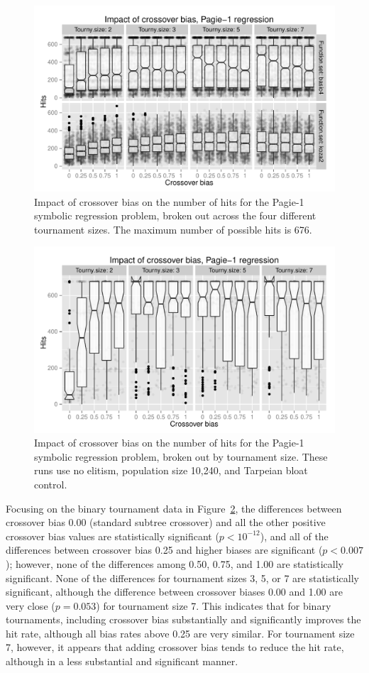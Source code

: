 \documentclass{sig-alternate}
\begin{document}
\begin{figure}
\centering
\includegraphics[width=0.45 \textwidth]{Plots/Pagie_1_Hits_vs_Bias_Tournys_FunctionSet.pdf}
\caption{Impact of crossover bias on the number of hits for the Pagie-1 symbolic regression problem, 
	broken out across the four different tournament sizes. The maximum number of possible hits is 676.}
\label{fig:Pagie1Hits_Bias_Tournys_FunctionSet}
\end{figure}

\begin{figure}
\centering
\includegraphics[width=0.45 \textwidth]{Plots/Pagie_1_strong_Hits_vs_Bias_Tournys_FunctionSet.pdf}
\caption{Impact of crossover bias on the number of hits for the Pagie-1 symbolic regression problem, 
	broken out by tournament size. These runs use no elitism, 
	population size 10,240, and Tarpeian bloat control.}
\label{fig:Pagie1StrongHits_Bias_Tournys_FunctionSet}
\end{figure}

Focusing on the binary tournament data in Figure~\ref{fig:Pagie1StrongHits_Bias_Tournys_FunctionSet}, the differences
between crossover bias 0.00 (standard subtree crossover) and all the other positive crossover bias values are
statistically significant ($p<10^{-12}$), and all of the differences between crossover bias 0.25 and higher biases are
significant ($p<0.007$); however, none of the differences among 0.50, 0.75, and 1.00 are statistically significant.
None of the differences for tournament sizes 3, 5, or 7 are statistically significant, although the difference between
crossover biases 0.00 and 1.00 are very close ($p=0.053$) for tournament size 7. This indicates that for binary
tournaments, including crossover bias substantially and significantly improves the hit rate, although all bias rates
above 0.25 are very similar. For tournament size 7, however, it appears that adding crossover bias tends to reduce the
hit rate, although in a less substantial and significant manner.
\end{document}
